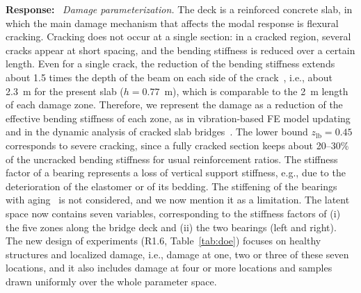 \documentclass[11pt]{article}
\newenvironment{response}{\par\smallskip\noindent\color{resp}\textbf{Response:}\ }{\par}
\newenvironment{action}{\par\smallskip\noindent\color{resp}\textbf{Action:}\ }{\par}
\newcommand{\tbd}[1]{\textcolor{note}{\textsf{[#1]}}}
\newcommand{\lines}[1]{\tbd{lines #1}}
\begin{document}
\begin{response}
\textit{Damage parameterization.} The deck is a reinforced concrete slab, in which the main damage mechanism that affects the modal response is flexural cracking.
Cracking does not occur at a single section: in a cracked region, several cracks appear at short spacing, and the bending stiffness is reduced over a certain length.
Even for a single crack, the reduction of the bending stiffness extends about 1.5 times the depth of the beam on each side of the crack~\cite{sinha2002simplified}, i.e., about 2.3~m for the present slab ($h=0.77$~m), which is comparable to the 2~m length of each damage zone.
Therefore, we represent the damage as a reduction of the effective bending stiffness of each zone, as in vibration-based FE model updating~\cite{teughels2002damage} and in the dynamic analysis of cracked slab bridges~\cite{moliner2017dynamic}.
The lower bound $z_{\text{lb}}=0.45$ corresponds to severe cracking, since a fully cracked section keeps about 20--30\% of the uncracked bending stiffness for usual reinforcement ratios.
The stiffness factor of a bearing represents a loss of vertical support stiffness, e.g., due to the deterioration of the elastomer or of its bedding.
The stiffening of the bearings with aging~\cite{erduran2022effect} is not considered, and we now mention it as a limitation. 
The latent space now contains seven variables, corresponding to the stiffness factors of (i) the five zones along the bridge deck and (ii) the two bearings (left and right). 
The new design of experiments (R1.6, Table~\ref{tab:doe}) focuses on healthy structures and localized damage, i.e., damage at one, two or three of these seven locations, and it also includes damage at four or more locations and samples drawn uniformly over the whole parameter space. 
\end{response}

\end{document}
